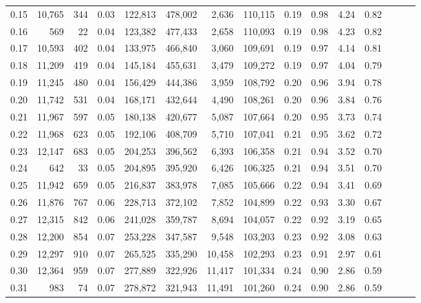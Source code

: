 \begin{tabular}{rrrrrrrrrrrrrrr}
0.15 &  10,765 &    344 &  0.03 &  122,813 &  478,002 &    2,636 &  110,115 &  0.19 &  0.98 &  4.24 &      0.82 \\
0.16 &     569 &     22 &  0.04 &  123,382 &  477,433 &    2,658 &  110,093 &  0.19 &  0.98 &  4.23 &      0.82 \\
0.17 &  10,593 &    402 &  0.04 &  133,975 &  466,840 &    3,060 &  109,691 &  0.19 &  0.97 &  4.14 &      0.81 \\
0.18 &  11,209 &    419 &  0.04 &  145,184 &  455,631 &    3,479 &  109,272 &  0.19 &  0.97 &  4.04 &      0.79 \\
0.19 &  11,245 &    480 &  0.04 &  156,429 &  444,386 &    3,959 &  108,792 &  0.20 &  0.96 &  3.94 &      0.78 \\
0.20 &  11,742 &    531 &  0.04 &  168,171 &  432,644 &    4,490 &  108,261 &  0.20 &  0.96 &  3.84 &      0.76 \\
0.21 &  11,967 &    597 &  0.05 &  180,138 &  420,677 &    5,087 &  107,664 &  0.20 &  0.95 &  3.73 &      0.74 \\
0.22 &  11,968 &    623 &  0.05 &  192,106 &  408,709 &    5,710 &  107,041 &  0.21 &  0.95 &  3.62 &      0.72 \\
0.23 &  12,147 &    683 &  0.05 &  204,253 &  396,562 &    6,393 &  106,358 &  0.21 &  0.94 &  3.52 &      0.70 \\
0.24 &     642 &     33 &  0.05 &  204,895 &  395,920 &    6,426 &  106,325 &  0.21 &  0.94 &  3.51 &      0.70 \\
0.25 &  11,942 &    659 &  0.05 &  216,837 &  383,978 &    7,085 &  105,666 &  0.22 &  0.94 &  3.41 &      0.69 \\
0.26 &  11,876 &    767 &  0.06 &  228,713 &  372,102 &    7,852 &  104,899 &  0.22 &  0.93 &  3.30 &      0.67 \\
0.27 &  12,315 &    842 &  0.06 &  241,028 &  359,787 &    8,694 &  104,057 &  0.22 &  0.92 &  3.19 &      0.65 \\
0.28 &  12,200 &    854 &  0.07 &  253,228 &  347,587 &    9,548 &  103,203 &  0.23 &  0.92 &  3.08 &      0.63 \\
0.29 &  12,297 &    910 &  0.07 &  265,525 &  335,290 &   10,458 &  102,293 &  0.23 &  0.91 &  2.97 &      0.61 \\
0.30 &  12,364 &    959 &  0.07 &  277,889 &  322,926 &   11,417 &  101,334 &  0.24 &  0.90 &  2.86 &      0.59 \\
0.31 &     983 &     74 &  0.07 &  278,872 &  321,943 &   11,491 &  101,260 &  0.24 &  0.90 &  2.86 &      0.59 \\

\end{tabular}
